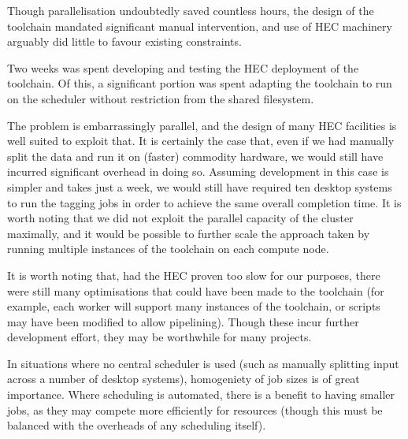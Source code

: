
Though parallelisation undoubtedly saved countless hours, the design of the toolchain mandated significant manual intervention, and use of HEC machinery arguably did little to favour existing constraints.

Two weeks was spent developing and testing the HEC deployment of the toolchain.  Of this, a significant portion was spent adapting the toolchain to run on the scheduler without restriction from the shared filesystem.

The problem is embarrassingly parallel, and the design of many HEC facilities is well suited to exploit that.  It is certainly the case that, even if we had manually split the data and run it on (faster) commodity hardware, we would still have incurred significant overhead in doing so.  Assuming development in this case is simpler and takes just a week, we would still have required ten desktop systems to run the tagging jobs in order to achieve the same overall completion time.  
It is worth noting that we did not exploit the parallel capacity of the cluster maximally, and it would be possible to further scale the approach taken by running multiple instances of the toolchain on each compute node. 

It is worth noting that, had the HEC proven too slow for our purposes, there were still many optimisations that could have been made to the toolchain (for example, each worker will support many instances of the toolchain, or scripts may have been modified to allow pipelining).  Though these incur further development effort, they may be worthwhile for many projects.

In situations where no central scheduler is used (such as manually splitting input across a number of desktop systems), homogeniety of job sizes is of great importance.  Where scheduling is automated, there is a benefit to having smaller jobs, as they may compete more efficiently for resources (though this must be balanced with the overheads of any scheduling itself).

